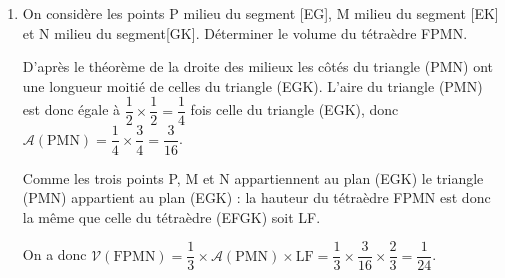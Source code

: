 \documentclass[10pt]{article}
\begin{document}
\begin{enumerate}
On a aussi $\mathcal{V}(\text{EFGK}) = \dfrac13 \times \mathcal{A}(\text{EGK}) \times \text{LF}$, soit $\dfrac16 = \dfrac13 \times \mathcal{A}(\text{EGK}) \times \dfrac23$ ou encore

$\dfrac16 = \dfrac29 \times \mathcal{A}(\text{EGK})$, d'où $\mathcal{A}(\text{EGK}) = \dfrac{\frac16}{\frac29} = \dfrac16 \times \dfrac92 = \dfrac{9}{12} = \dfrac34$.
\item On considère les points P milieu du segment [EG], M milieu du segment [EK] et N milieu du segment[GK]. Déterminer le volume du tétraèdre FPMN.

D'après le théorème de la droite des milieux les côtés du triangle (PMN) ont une longueur moitié de celles du triangle (EGK). L'aire du triangle (PMN) est donc égale à $\dfrac12 \times \dfrac12 = \dfrac14$ fois celle du triangle (EGK), donc $\mathcal{A}(\text{PMN}) = \dfrac14 \times \dfrac34 = \dfrac{3}{16}$.

Comme les trois points P, M et N appartiennent au plan (EGK) le triangle (PMN) appartient au plan (EGK) : la hauteur du tétraèdre FPMN est donc la même que celle du tétraèdre (EFGK) soit LF.

On a donc $\mathcal{V}(\text{FPMN}) = \dfrac13 \times \mathcal{A}(\text{PMN}) \times \text{LF} = \dfrac13 \times \dfrac{3}{16} \times \dfrac{2}{3} = \dfrac{1}{24}$.
\end{enumerate}

\bigskip
\end{document}
